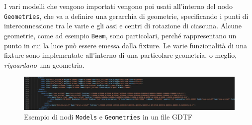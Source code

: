 \documentclass[main.tex]{subfiles}
\begin{document}
I vari modelli che vengono importati vengono poi usati all'interno del nodo \lstinline{Geometries}, che va a definire una gerarchia di geometrie, specificando i punti di interconnessione tra le varie e gli assi e centri di rotazione di ciascuna. Alcune geometrie, come ad esempio \lstinline{Beam}, sono particolari, perché rappresentano un punto in cui la luce può essere emessa dalla fixture.\newline
Le varie funzionalità di una fixture sono implementate all'interno di una particolare geometria, o meglio, \textit{riguardano} una geometria.
\begin{figure}[H]
    \centering
    \includegraphics[width=1\linewidth]{img/introduzione/GDTFgeometriesExample.jpg}
    \caption{Esempio di nodi \lstinline{Models} e \lstinline{Geometries} in un file GDTF}
    \label{fig:1_gdtfGeometriesExample}
\end{figure}
\end{document}

